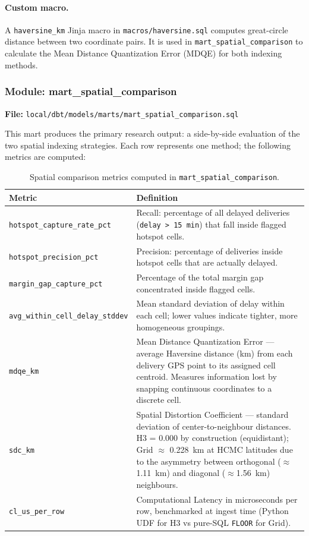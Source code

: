 \paragraph{Custom macro.}
A \texttt{haversine\_km} Jinja macro in \texttt{macros/haversine.sql} computes great-circle
distance between two coordinate pairs. It is used in \texttt{mart\_spatial\_comparison} to
calculate the Mean Distance Quantization Error (MDQE) for both indexing methods.

\subsubsection{Module: mart\_spatial\_comparison}
\label{sec:spatial_comparison}

\textbf{File:} \texttt{local/dbt/models/marts/mart\_spatial\_comparison.sql}

This mart produces the primary research output: a side-by-side evaluation of the two
spatial indexing strategies. Each row represents one method; the following metrics are
computed:

\begin{table}[H]
\centering
\begin{tabular}{lp{9cm}}
\hline
\textbf{Metric} & \textbf{Definition} \\
\hline
\texttt{hotspot\_capture\_rate\_pct} & Recall: percentage of all delayed deliveries
  (\texttt{delay > 15 min}) that fall inside flagged hotspot cells. \\
\texttt{hotspot\_precision\_pct} & Precision: percentage of deliveries inside hotspot
  cells that are actually delayed. \\
\texttt{margin\_gap\_capture\_pct} & Percentage of the total margin gap concentrated
  inside flagged cells. \\
\texttt{avg\_within\_cell\_delay\_stddev} & Mean standard deviation of delay within each
  cell; lower values indicate tighter, more homogeneous groupings. \\
\texttt{mdqe\_km} & Mean Distance Quantization Error — average Haversine distance (km)
  from each delivery GPS point to its assigned cell centroid. Measures information lost
  by snapping continuous coordinates to a discrete cell. \\
\texttt{sdc\_km} & Spatial Distortion Coefficient — standard deviation of center-to-neighbour
  distances. H3 = 0.000 by construction (equidistant); Grid $\approx$ 0.228~km at HCMC
  latitudes due to the asymmetry between orthogonal ($\approx$1.11~km) and diagonal
  ($\approx$1.56~km) neighbours. \\
\texttt{cl\_us\_per\_row} & Computational Latency in microseconds per row, benchmarked
  at ingest time (Python UDF for H3 vs pure-SQL \texttt{FLOOR} for Grid). \\
\hline
\end{tabular}
\caption{Spatial comparison metrics computed in \texttt{mart\_spatial\_comparison}.}
\label{tab:spatial_metrics}
\end{table}

